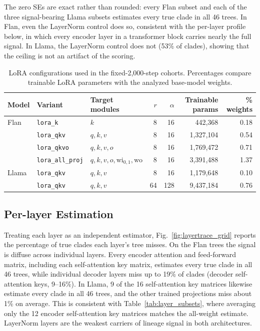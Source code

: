 \documentclass{article}
\theoremstyle{definition}
\theoremstyle{plain}
\newif\ifrevision
\newcommand{\rev}[1]{\ifrevision{\color{blue}#1}\else#1\fi}
\newcommand{\revtag}[1]{\ifrevision\textsuperscript{\color{blue}\sffamily\scriptsize[#1]}\fi}
\begin{document}
The zero SEs are exact rather than rounded: every Flan subset and each of the three signal-bearing
Llama subsets estimates every true clade in all 46 trees. In Flan, even the LayerNorm control does so, consistent with the per-layer profile below, in which every encoder layer in a transformer block carries nearly the full signal. In Llama, the LayerNorm control does not (53\% of clades), showing that the ceiling is not an artifact of the scoring.

\begin{table}[h]
\caption{LoRA configurations used in the fixed-2,000-step cohorts. Percentages compare trainable
LoRA parameters with the analyzed base-model weights.}
\label{tab:lora_variants}
\centering
\scriptsize
\begin{tabular}{lllrrrr}
\toprule
Model & Variant & Target modules & $r$ & $\alpha$ & Trainable params & \% weights \\
\midrule
Flan & \texttt{lora\_k}         & $k$                                      & 8  & 16  & 442,368   & 0.18 \\
     & \texttt{lora\_qkv}       & $q,k,v$                                  & 8  & 16  & 1,327,104 & 0.54 \\
     & \texttt{lora\_qkvo}      & $q,k,v,o$                                & 8  & 16  & 1,769,472 & 0.71 \\
     & \texttt{lora\_all\_proj} & $q,k,v,o,\mathrm{wi}_{0,1},\mathrm{wo}$ & 8  & 16  & 3,391,488 & 1.37 \\
\midrule
Llama & \texttt{lora\_qkv}      & $q,k,v$                                  & 8  & 16  & 1,179,648 & 0.10 \\
      & \texttt{lora\_qkv}      & $q,k,v$                                  & 64 & 128 & 9,437,184 & 0.76 \\
\bottomrule
\end{tabular}
\end{table}

\subsection*{Per-layer Estimation}
\label{app:layertrace}
Treating each layer as an independent estimator, Fig.~\ref{fig:layertrace_grid} reports the percentage
of true clades each layer's tree misses. On the Flan trees the signal is diffuse across individual layers. 
Every encoder attention and feed-forward matrix, including each self-attention key matrix, estimates every true clade in
all 46 trees, while individual decoder layers miss up to 19\% of clades (decoder self-attention keys, 9--16\%). In Llama, \rev{9}\revtag{Corr.} of the 16
self-attention key matrices likewise estimate every clade in all 46 trees, and the other trained
projections miss about 1\% on average. This is consistent with Table~\ref{tab:layer_subsets}, where averaging
only the 12 encoder self-attention key matrices matches the all-weight estimate. LayerNorm layers are the weakest carriers of lineage signal in both architectures.
\end{document}
